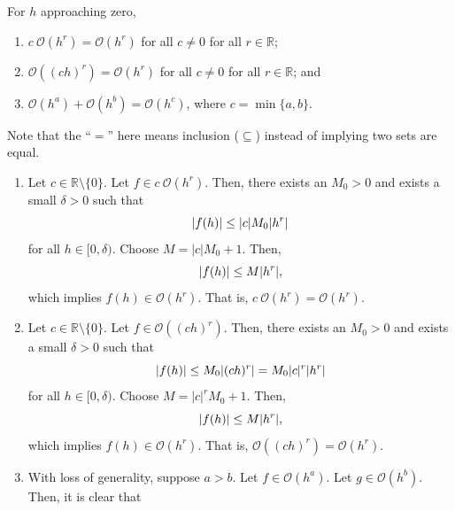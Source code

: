 \documentclass[11pt]{article}
\theoremstyle{break}
\numberwithin{equation}{theorem}
\begin{document}
\begin{theorem}
    For $h$ approaching zero,
    \begin{enumerate}
        \item $c\:\mathcal{O}(h^r)=\mathcal{O}(h^r)$ for all $c\ne0$ for all $r\in\mathbb R$;
        \item $\mathcal{O}((ch)^r)=\mathcal{O}(h^r)$ for all $c\ne0$ for all $r\in\mathbb R$; and
        \item $\mathcal{O}(h^a)+\mathcal{O}(h^b)=\mathcal{O}(h^c)$, where $c=\min\{a, b\}$.
    \end{enumerate}
    Note that the ``$=$'' here means inclusion ($\subseteq$) instead of implying two sets are equal.
\end{theorem}
\begin{enumerate}
    \item Let $c\in\mathbb{R}\setminus\{0\}$. Let $f\in c\:\mathcal{O}(h^r)$. Then, there exists an $M_0>0$ and exists a small $\delta>0$ such that \vspace{-0.6em}
    \begin{equation*}
        |f(h)|\leq |c|M_0|h^r| \vspace{-0.6em}
    \end{equation*}
    for all $h\in[0, \delta)$. Choose $M=|c|M_0+1$. Then, \vspace{-0.6em}
    \begin{equation*}
        |f(h)|\leq M|h^r|, \vspace{-0.6em}
    \end{equation*}
    which implies $f(h)\in\mathcal{O}(h^r)$. That is, $c\:\mathcal{O}(h^r)=\mathcal{O}(h^r)$.
    \item Let $c\in\mathbb{R}\setminus\{0\}$. Let $f\in \mathcal{O}((ch)^r)$. Then, there exists an $M_0>0$ and exists a small $\delta>0$ such that \vspace{-0.6em}
    \begin{equation*}
        |f(h)|\leq M_0|(ch)^r|=M_0|c|^r|h^r| \vspace{-0.6em}
    \end{equation*}
    for all $h\in[0, \delta)$. Choose $M=|c|^rM_0+1$. Then, \vspace{-0.6em}
    \begin{equation*}
        |f(h)|\leq M|h^r|, \vspace{-0.6em}
    \end{equation*}
    which implies $f(h)\in\mathcal{O}(h^r)$. That is, $\mathcal{O}((ch)^r)=\mathcal{O}(h^r)$.
    \item With loss of generality, suppose $a>b$. Let $f\in\mathcal{O}(h^a)$. Let $g\in\mathcal{O}(h^b)$. Then, it is clear that \vspace{-0.6em}

\end{enumerate}
\end{document}
